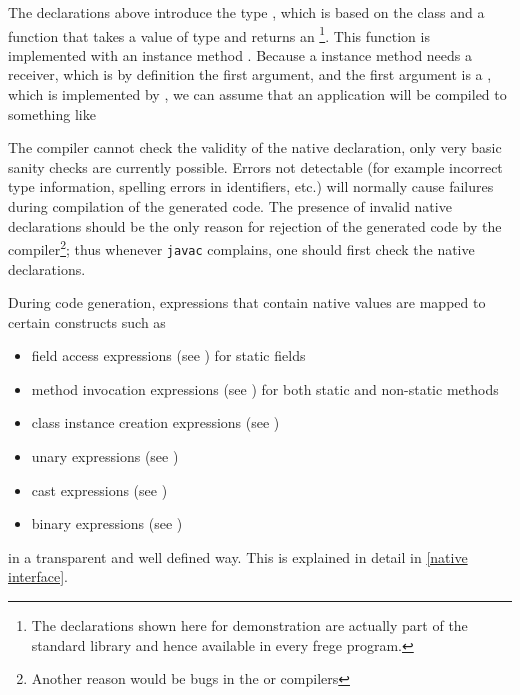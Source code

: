 The declarations above introduce the type , which is based on the \java{} class  and a function  that takes a value of type  and returns an 
\footnote{The declarations shown here for demonstration are actually part of the standard library and hence available in every frege program.}. 
This function is implemented with an instance method . Because a \java{} instance method needs a receiver, which is by definition the first argument, and the first argument is a , which is implemented by  , we can assume that an application  will be compiled to something like 

The \frege{} compiler cannot check the validity of the native declaration, only very basic sanity checks are currently possible.
 Errors not detectable (for example incorrect type information, spelling errors in identifiers, etc.) will normally cause failures during compilation of the generated \java{} code. 
The presence of invalid native declarations should be the only reason for rejection of the generated code by the \java{} compiler\footnote{Another reason would be bugs in the \java{} or \frege{} compilers}; thus whenever \texttt{javac} complains, one should first check the native declarations.

During code generation, expressions that contain native values  are mapped to certain \java{} constructs such as

\begin{itemize}
\item field access expressions (see \cite[section 15.11]{langspec3}) for static fields
\item method invocation expressions (see \cite[section 15.12]{langspec3}) for both static and non-static methods
\item class instance creation expressions (see \cite[section 15.9]{langspec3})
\item unary expressions (see \cite[section 15.15]{langspec3})
\item cast expressions (see \cite[section 15.16]{langspec3})
\item binary expressions (see \cite[section 15.17 to 15.24]{langspec3})
\end{itemize}

in a transparent and well defined way. This is explained in detail in \autoref{native interface}.
